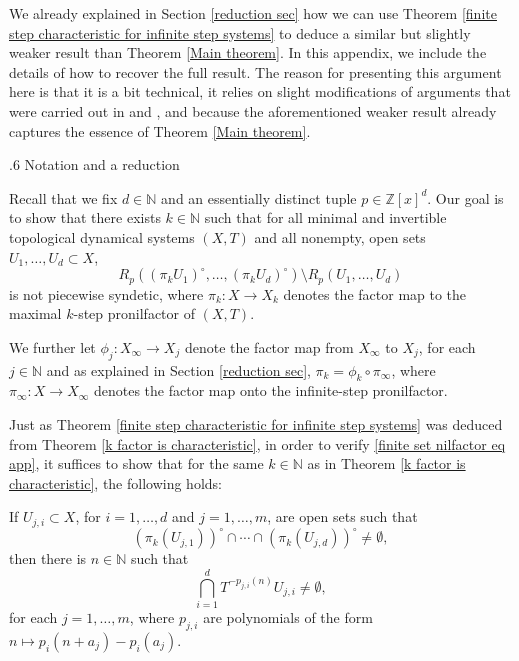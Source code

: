\documentclass[reqno]{amsart}
\makeatletter
\def\Z{{\mathbb Z}}
\def\N{{\mathbb N}}
\theoremstyle{definition}
\def\subsection{\@startsection{subsection}{2}%
  \z@{.4\linespacing\@plus.7\linespacing}
{.6\baselineskip}%
  {\normalfont\centering\bfseries}%
}
\theoremstyle{remark}
\def\N{{\mathbb N}}
\makeatother
\begin{document}
We 
already explained in Section \ref{reduction sec} 
how we can use Theorem \ref{finite step characteristic for infinite step systems} to 
deduce a similar but slightly weaker result than 
Theorem \ref{Main theorem}. In this appendix, we 
include the details 
of how to recover the full result. The reason for 
presenting this argument here is that it is a bit 
technical, it relies on slight modifications 
of arguments that were carried out in 
\cite{Huang_Shao_Ye} and \cite{Ye_Yu}, and because the
aforementioned weaker result already captures the essence of 
Theorem \ref{Main theorem}.   

\subsection{Notation and a reduction}

Recall that we fix $d\in \N$ and an essentially 
distinct tuple $p\in \Z[x]^d$. Our goal is to 
show that there exists $k\in \N$ such that for all minimal and invertible
topological dynamical systems $(X,T)$ and all nonempty, open 
sets $U_1,\ldots,U_d \subset X$,
\begin{equation}\label{finite set nilfactor eq app}
R_p((\pi_k U_1)^{\circ},\ldots,(\pi_k U_d)^{\circ}) \setminus R_p(U_1,\ldots,U_d)   
\end{equation}
is not piecewise syndetic, where $\pi_k:X\to X_k$ denotes the 
factor map to the maximal $k$-step pronilfactor of $(X,T)$. 

We further let $\phi_j:X_{\infty}\to X_j$ denote 
the factor map from $X_{\infty}$ 
to $X_j$, for each $j\in \N$ and as explained in Section \ref{reduction sec}, $\pi_k=\phi_k \circ \pi_{\infty}$, where $\pi_{\infty}:X\to X_{\infty}$ denotes the factor map onto the infinite-step pronilfactor. 

Just as Theorem \ref{finite step characteristic for infinite step systems} was deduced from Theorem \ref{k factor is characteristic}, in order to verify \eqref{finite set nilfactor eq app}, it suffices to show that for the same $k\in \N$ as in Theorem \ref{k factor is characteristic}, the following holds:

If $U_{j,i}\subset X$, for $i=1,\ldots,d$ and 
$j=1,\ldots,m$, are open sets such that 
$$(\pi_k(U_{j,1}))^{\circ} \cap \cdots \cap (\pi_k(U_{j,d}))^{\circ} \neq \emptyset, $$
then there is $n\in \N$ such that 
\begin{equation}\label{same return time app}
\bigcap_{i=1}^d T^{-p_{j,i}(n)}U_{j,i} \neq \emptyset,    
\end{equation}
for each $j=1,\ldots,m$, where $p_{j,i}$ are polynomials of the form $n\mapsto p_i(n+a_j)-p_i(a_j)$. 
\end{document}

